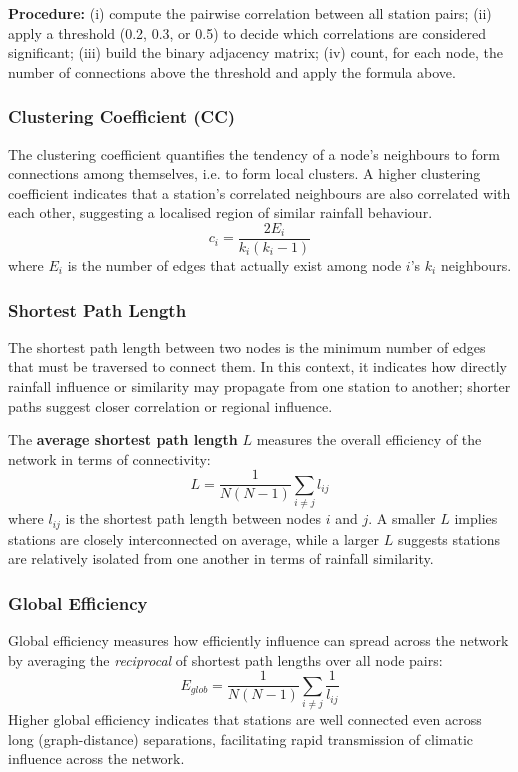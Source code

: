 \documentclass[11pt]{article}
\begin{document}
\textbf{Procedure:} (i) compute the pairwise correlation between all station pairs; (ii) apply a
threshold (0.2, 0.3, or 0.5) to decide which correlations are considered significant; (iii) build the
binary adjacency matrix; (iv) count, for each node, the number of connections above the threshold and
apply the formula above.

\subsubsection{Clustering Coefficient (CC)}
The clustering coefficient quantifies the tendency of a node's neighbours to form connections among
themselves, i.e. to form local clusters. A higher clustering coefficient indicates that a station's
correlated neighbours are also correlated with each other, suggesting a localised region of similar
rainfall behaviour.
\[
c_i = \frac{2E_i}{k_i(k_i - 1)}
\]
where $E_i$ is the number of edges that actually exist among node $i$'s $k_i$ neighbours.

\subsubsection{Shortest Path Length}
The shortest path length between two nodes is the minimum number of edges that must be traversed to
connect them. In this context, it indicates how directly rainfall influence or similarity may
propagate from one station to another; shorter paths suggest closer correlation or regional
influence.

The \textbf{average shortest path length} $L$ measures the overall efficiency of the network in
terms of connectivity:
\[
L = \frac{1}{N(N-1)} \sum_{i \neq j} l_{ij}
\]
where $l_{ij}$ is the shortest path length between nodes $i$ and $j$. A smaller $L$ implies stations
are closely interconnected on average, while a larger $L$ suggests stations are relatively isolated
from one another in terms of rainfall similarity.

\subsubsection{Global Efficiency}
Global efficiency measures how efficiently influence can spread across the network by averaging the
\emph{reciprocal} of shortest path lengths over all node pairs:
\[
E_{glob} = \frac{1}{N(N-1)} \sum_{i \neq j} \frac{1}{l_{ij}}
\]
Higher global efficiency indicates that stations are well connected even across long (graph-distance)
separations, facilitating rapid transmission of climatic influence across the network.
\end{document}
